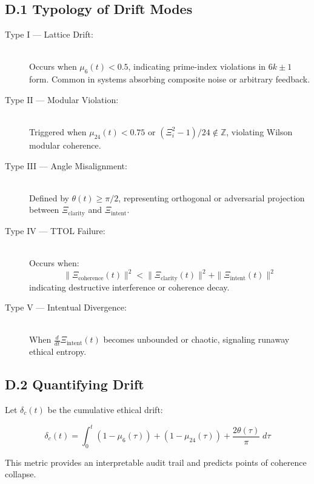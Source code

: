 \documentclass[12pt]{article}
\begin{document}
\subsection*{D.1 Typology of Drift Modes}

\begin{description}
  \item[Type I — Lattice Drift:] \hfill \\
  Occurs when $\mu_6(t) < 0.5$, indicating prime-index violations in $6k \pm 1$ form. Common in systems absorbing composite noise or arbitrary feedback.

  \item[Type II — Modular Violation:] \hfill \\
  Triggered when $\mu_{24}(t) < 0.75$ or $(\Xi_i^2 - 1)/24 \notin \mathbb{Z}$, violating Wilson modular coherence.

  \item[Type III — Angle Misalignment:] \hfill \\
  Defined by $\theta(t) \geq \pi/2$, representing orthogonal or adversarial projection between $\Xi_{\text{clarity}}$ and $\Xi_{\text{intent}}$.

  \item[Type IV — TTOL Failure:] \hfill \\
  Occurs when:
  $$
  \|\Xi_{\text{coherence}}(t)\|^2 < \|\Xi_{\text{clarity}}(t)\|^2 + \|\Xi_{\text{intent}}(t)\|^2
  $$
  indicating destructive interference or coherence decay.

  \item[Type V — Intentual Divergence:] \hfill \\
  When $\frac{d}{dt}\Xi_{\text{intent}}(t)$ becomes unbounded or chaotic, signaling runaway ethical entropy.
\end{description}

\subsection*{D.2 Quantifying Drift}

Let $\delta_c(t)$ be the cumulative ethical drift:

\begin{equation}
\delta_c(t) = \int_0^t \left(1 - \mu_6(\tau)\right) + \left(1 - \mu_{24}(\tau)\right) + \frac{2\theta(\tau)}{\pi} \; d\tau
\end{equation}

\noindent
This metric provides an interpretable audit trail and predicts points of coherence collapse.
\end{document}

